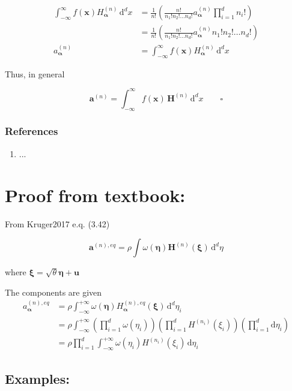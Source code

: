 \documentclass[draft]{article}
\begin{document}
\begin{align*}
	\int_{-\infty}^{\infty} f(\bm{x}) H^{(n)}_{\bm{\alpha}} \, \text{d}^d x &= \frac{1}{n!} \left ( \frac{n!}{n_1!n_2! \dots n_d!} a^{(n)}_{\bm{\alpha}} \prod_{i=1}^{d} n_i! \right ) \\
	&= \frac{1}{n!} \left ( \frac{n!}{n_1!n_2! \dots n_d!} a^{(n)}_{\bm{\alpha}} n_1!n_2! \dots n_d! \right ) \\
	a^{(n)}_{\bm{\alpha}} &= \int_{-\infty}^{\infty} f(\bm{x}) H^{(n)}_{\bm{\alpha}} \, \text{d}^d x
\end{align*}

Thus, in general

$$
\bm{a}^{(n)} = \int_{-\infty}^{\infty} f(\bm{x}) \, \bm{H}^{(n)} \, \text{d}^d x \qquad \square
$$

\vspace*{1cm}
\subsubsection*{References}
\begin{enumerate}
	\item \label{} ...
\end{enumerate}
\clearpage

\section*{Proof from textbook:}
From Kruger2017 e.q. (3.42)

\[
\bm{a}^{(n),eq} = \rho \int \omega(\bm{\eta})\bm{H}^{(n)} (\bm{\xi}) \,\text{d}^d \eta
\]

where $\bm{\xi} = \sqrt{\theta}\bm{\eta} + \bm{u}$

The components are given
\begin{align*}
	a^{(n),eq}_{\bm{\alpha}} &= \rho \int_{-\infty}^{+\infty} \omega(\bm{\eta}) H^{(n),eq}_{\bm{\alpha}} (\bm{\xi}) \,\text{d}^d \eta_i \\
	                                     &= \rho \int_{-\infty}^{+\infty} \left ( \prod_{i=1}^{d} \omega(\eta_i)\right ) \left ( \prod_{i=1}^{d} H^{(n_i)}({\xi_i}) \right ) \left ( \prod_{i=1}^{d} \text{d} \eta_i \right ) \\
	                                     &= \rho \prod_{i=1}^{d} \int_{-\infty}^{+\infty} \omega(\eta_i) H^{(n_i)}({\xi_i}) \,\text{d} \eta_i
\end{align*}

\subsection*{Examples:}
\end{document}
